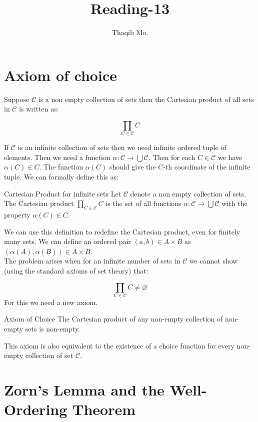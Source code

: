 \documentclass[16pt,a4paper]{article}
\author{Thaqib Mo.}
\title{ Reading-13 }
\theoremstyle{definition}
\begin{document}
\maketitle
\newpage
\section{Axiom of choice}

Suppose $\mathcal{C}$ is a non empty collection of sets then the Cartesian product of all sets in $\mathcal{C}$ is written as:

\[\prod\limits_{C\in \mathcal{C}} C\] 

If $\mathcal{C}$ is an infinite collection of sets then we need infinite ordered tuple of elements. Then we need a function $\alpha : \mathcal{C} \rightarrow \bigcup \mathcal{C}$. Then for each $C\in \mathcal{C}$ we have $\alpha(C) \in C$. The function $\alpha (C)$ should give the $C$-th coordinate of the infinite tuple. We can formally define this as:\\

\begin{defn}{Cartesian Product for infinite sets}{}
Let $\mathcal{C}$ denote a non empty collection of sets. The Cartesian product $\prod\limits_{C\in \mathcal{C}}C$  is the set of all functions $\alpha : \mathcal{C} \rightarrow \bigcup \mathcal{C}$  with the property $\alpha(C) \in C$.
\end{defn} 

We can use this definition to redefine the Cartesian product, even for finitely many sets. We can define an ordered pair $(a,b) \in A\times B$ as $(\alpha(A), \alpha(B))\in A\times B$. \\
The problem arises when for an infinite number of sets in $\mathcal{C}$ we cannot show (using the standard axioms of set theory) that:

\[\prod_{C\in \mathcal{C}}C \neq \varnothing\]
For this we need a new axiom. 

\begin{axm}{Axiom of Choice}{}
The Cartesian product of any non-empty collection of non-empty sets is
non-empty.
\end{axm}
This axiom is also equivalent to the existence of a choice function for every non-empty collection of set $\mathcal{C}$.   




\newpage

\section{Zorn's Lemma and the Well-Ordering Theorem}
\end{document}
